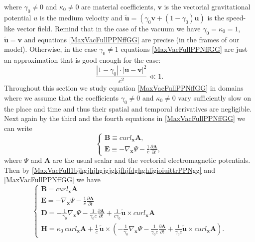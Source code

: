 \documentclass{article}
\theoremstyle{definition}
\theoremstyle{remark}
\renewcommand{\vec}[1]{\mathbf{#1}}
\newcommand{\er}{\eqref}
\newcommand{\er}{\eqref}
\begin{document}
%
%
%
where $\gamma_0\neq 0$ and $\kappa_0\neq 0$ are material
coefficients, $\vec v$ is the vectorial gravitational potential $u$
is the medium velocity and $\vec {\tilde u}=\left(\gamma_0\vec
v+(1-\gamma_0)\vec u\right)$ is the speed-like vector field. Remind
that in the case of the vacuum we have $\gamma_0=\kappa_0=1$, $\vec
{\tilde u}=\vec v$ and equations \er{MaxVacFullPPNffGG} are precise
(in the frames of our model). Otherwise, in the case $\gamma_0\neq
1$ equations \er{MaxVacFullPPNffGG} are just an approximation that
is good enough for the case:
\begin{equation}\label{OprdddsimGGffyhjyhhtygrffgfzzjjj}
\frac{|1-\gamma_0|\cdot|\vec u-\vec v|^2}{c^2}\ll 1.
\end{equation}
Throughout this section we study equation \er{MaxVacFullPPNffGG} in
domains where we assume that the coefficients $\gamma_0\neq 0$ and
$\kappa_0\neq 0$ vary sufficiently slow on the place and time and
thus their spatial and temporal derivatives are negligible. Next
again by the third and the fourth equations in
\er{MaxVacFullPPNffGG} we can write
\begin{equation}\label{MaxVacFull1bjkgjhjhgjgjgkjfhjfdghghligioiuittrPPNgg}
\begin{cases}
\vec B\equiv curl_{\vec x} \vec A,\\
\vec E\equiv-\nabla_{\vec x}\Psi-\frac{1}{c}\frac{\partial\vec
A}{\partial t},
\end{cases}
\end{equation}
where $\Psi$ and $\vec A$ are the usual scalar and the vectorial
electromagnetic potentials. Then by
\er{MaxVacFull1bjkgjhjhgjgjgkjfhjfdghghligioiuittrPPNgg} and
\er{MaxVacFullPPNffGG} we have
\begin{equation}\label{vhfffngghPPN333yuyuGG}
\begin{cases}
\vec B= curl_{\vec x} \vec A\\
\vec E=-\nabla_{\vec x}\Psi-\frac{1}{c}\frac{\partial\vec
A}{\partial t}\\
 \vec D=-\frac{1}{\gamma_0}\nabla_{\vec
x}\Psi-\frac{1}{\gamma_0 c}\frac{\partial\vec A}{\partial t}+\frac{1}{c\gamma_0}\vec {\tilde u}\times curl_{\vec x}\vec A\\
\vec H= \kappa_0 \,curl_{\vec x} \vec A+\frac{1}{c}\,\vec {\tilde
u}\times\left(-\frac{1}{\gamma_0}\nabla_{\vec
x}\Psi-\frac{1}{\gamma_0 c}\frac{\partial\vec A}{\partial
t}+\frac{1}{\gamma_0 c}\vec {\tilde u}\times curl_{\vec x}\vec
A\right).
\end{cases}
\end{equation}
\end{document}

